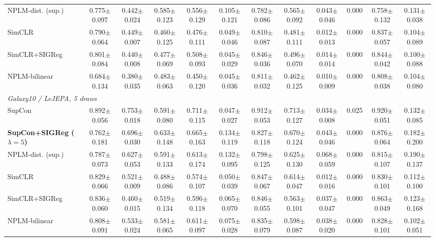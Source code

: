 \begin{landscape}
\begin{center}
\begin{longtable}{lccccccccccc}
\quad NPLM-dist. (sup.) & 0.775$\pm$0.097 & 0.442$\pm$0.024 & 0.585$\pm$0.123 & 0.556$\pm$0.129 & 0.105$\pm$0.121 & 0.782$\pm$0.086 & 0.565$\pm$0.092 & 0.043$\pm$0.046 & 0.000 & 0.758$\pm$0.132 & 0.131$\pm$0.038 \\
\quad SimCLR & 0.790$\pm$0.064 & 0.449$\pm$0.007 & 0.460$\pm$0.125 & 0.476$\pm$0.111 & 0.049$\pm$0.046 & 0.810$\pm$0.087 & 0.481$\pm$0.111 & 0.012$\pm$0.013 & 0.000 & 0.837$\pm$0.057 & 0.104$\pm$0.089 \\
\quad SimCLR+SIGReg & 0.801$\pm$0.084 & 0.440$\pm$0.008 & 0.477$\pm$0.069 & 0.508$\pm$0.093 & 0.045$\pm$0.029 & 0.846$\pm$0.036 & 0.496$\pm$0.070 & 0.014$\pm$0.014 & 0.000 & 0.844$\pm$0.042 & 0.100$\pm$0.088 \\
\quad NPLM-bilinear & 0.684$\pm$0.134 & 0.380$\pm$0.035 & 0.483$\pm$0.063 & 0.450$\pm$0.120 & 0.045$\pm$0.036 & 0.811$\pm$0.032 & 0.462$\pm$0.125 & 0.010$\pm$0.009 & 0.000 & 0.808$\pm$0.038 & 0.104$\pm$0.080 \\
\multicolumn{12}{l}{\emph{Galaxy10 / LeJEPA, 5 draws}} \\
\quad SupCon & 0.892$\pm$0.056 & 0.753$\pm$0.018 & 0.591$\pm$0.080 & 0.711$\pm$0.115 & 0.047$\pm$0.027 & 0.912$\pm$0.053 & 0.713$\pm$0.127 & 0.034$\pm$0.008 & 0.025 & 0.920$\pm$0.051 & 0.132$\pm$0.085 \\
\quad \textbf{SupCon+SIGReg ($\lambda{=}5$)} & 0.762$\pm$0.181 & 0.696$\pm$0.030 & 0.633$\pm$0.148 & 0.665$\pm$0.163 & 0.134$\pm$0.119 & 0.827$\pm$0.118 & 0.670$\pm$0.124 & 0.043$\pm$0.046 & 0.000 & 0.876$\pm$0.064 & 0.182$\pm$0.200 \\
\quad NPLM-dist. (sup.) & 0.787$\pm$0.073 & 0.627$\pm$0.053 & 0.591$\pm$0.133 & 0.613$\pm$0.174 & 0.132$\pm$0.095 & 0.798$\pm$0.125 & 0.625$\pm$0.130 & 0.068$\pm$0.059 & 0.000 & 0.815$\pm$0.107 & 0.190$\pm$0.137 \\
\quad SimCLR & 0.829$\pm$0.066 & 0.521$\pm$0.009 & 0.488$\pm$0.086 & 0.574$\pm$0.107 & 0.050$\pm$0.039 & 0.847$\pm$0.067 & 0.614$\pm$0.047 & 0.012$\pm$0.016 & 0.000 & 0.830$\pm$0.101 & 0.112$\pm$0.100 \\
\quad SimCLR+SIGReg & 0.836$\pm$0.060 & 0.460$\pm$0.015 & 0.519$\pm$0.134 & 0.596$\pm$0.118 & 0.065$\pm$0.070 & 0.846$\pm$0.055 & 0.563$\pm$0.101 & 0.037$\pm$0.047 & 0.000 & 0.863$\pm$0.049 & 0.123$\pm$0.168 \\
\quad NPLM-bilinear & 0.808$\pm$0.091 & 0.533$\pm$0.024 & 0.581$\pm$0.065 & 0.611$\pm$0.097 & 0.075$\pm$0.028 & 0.835$\pm$0.079 & 0.598$\pm$0.087 & 0.038$\pm$0.020 & 0.000 & 0.828$\pm$0.101 & 0.102$\pm$0.051 \\

\end{longtable}
\end{center}
\end{landscape}
